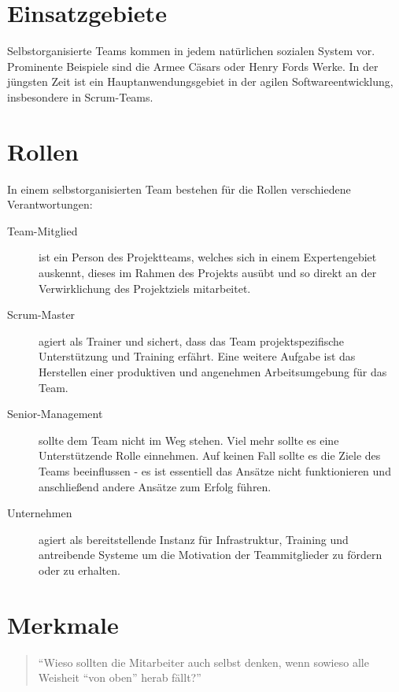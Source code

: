 \newpage
\section{Einsatzgebiete}
Selbstorganisierte Teams kommen in jedem natürlichen sozialen System vor. Prominente Beispiele sind die Armee Cäsars oder Henry Fords Werke. In der jüngsten Zeit ist ein Hauptanwendungsgebiet in der agilen Softwareentwicklung, insbesondere in Scrum-Teams.\cite{Gloger2014}

\section{Rollen}

In einem selbstorganisierten Team bestehen für die Rollen verschiedene Verantwortungen:\cite{Mittal2013}
\begin{description}
	\item[Team-Mitglied] ist ein Person des Projektteams, welches sich in einem Expertengebiet auskennt, dieses im Rahmen des Projekts ausübt und so direkt an der Verwirklichung des Projektziels mitarbeitet.
	
	\item[Scrum-Master] agiert als Trainer und sichert, dass das Team projektspezifische Unterstützung und Training erfährt. Eine weitere Aufgabe ist das Herstellen einer produktiven und angenehmen Arbeitsumgebung für das Team.
	
	\item[Senior-Management] sollte dem Team nicht im Weg stehen. Viel mehr sollte es eine Unterstützende Rolle einnehmen. Auf keinen Fall sollte es die Ziele des Teams beeinflussen - es ist essentiell das Ansätze nicht funktionieren und anschließend andere Ansätze zum Erfolg führen.
	
	\item[Unternehmen] agiert als bereitstellende Instanz für Infrastruktur, Training und antreibende Systeme um die Motivation der Teammitglieder zu fördern oder zu erhalten.
\end{description}

\section{Merkmale}\label{Merkmale}

\begin{quote}
"`Wieso sollten die Mitarbeiter auch selbst denken, wenn sowieso alle Weisheit "`von oben"' herab fällt?"'\cite{Maximini2014}
\end{quote}

